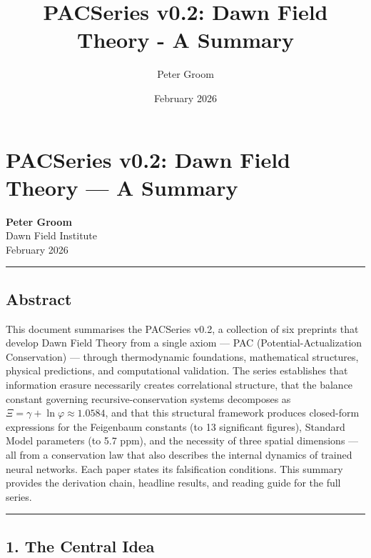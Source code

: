 \documentclass[
  11pt,
  a4paper]{article}
\title{PACSeries v0.2: Dawn Field Theory - A Summary}
\author{Peter Groom}
\date{February 2026}
\begin{document}
\maketitle

\renewcommand*\contentsname{Contents}
{
\setcounter{tocdepth}{3}
\tableofcontents
}
\section{PACSeries v0.2: Dawn Field Theory --- A
Summary}\label{pacseries-v0.2-dawn-field-theory-a-summary}

\textbf{Peter Groom}\\
Dawn Field Institute\\
February 2026

\begin{center}\rule{0.5\linewidth}{0.5pt}\end{center}

\subsection{Abstract}\label{abstract}

This document summarises the PACSeries v0.2, a collection of six
preprints that develop Dawn Field Theory from a single axiom --- PAC
(Potential-Actualization Conservation) --- through thermodynamic
foundations, mathematical structures, physical predictions, and
computational validation. The series establishes that information
erasure necessarily creates correlational structure, that the balance
constant governing recursive-conservation systems decomposes as
\(\Xi = \gamma + \ln\varphi \approx 1.0584\), and that this structural
framework produces closed-form expressions for the Feigenbaum constants
(to 13 significant figures), Standard Model parameters (to 5.7 ppm), and
the necessity of three spatial dimensions --- all from a conservation
law that also describes the internal dynamics of trained neural
networks. Each paper states its falsification conditions. This summary
provides the derivation chain, headline results, and reading guide for
the full series.

\begin{center}\rule{0.5\linewidth}{0.5pt}\end{center}

\subsection{1. The Central Idea}\label{the-central-idea}
\end{document}
